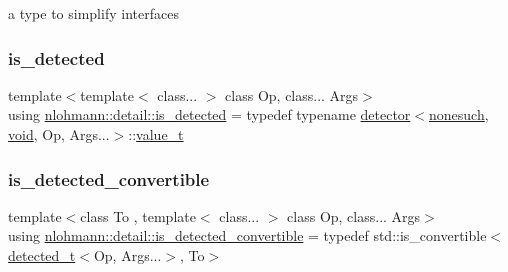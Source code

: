 a type to simplify interfaces 

\mbox{\label{namespacenlohmann_1_1detail_a9135fcf616d6ac6e231a86e0a055ac44}} 
\subsubsection{\texorpdfstring{is\_detected}{is\_detected}}
{\footnotesize\ttfamily template$<$template$<$ class... $>$ class Op, class... Args$>$ \\
using \mbox{\hyperlink{namespacenlohmann_1_1detail_a9135fcf616d6ac6e231a86e0a055ac44}{nlohmann\+::detail\+::is\+\_\+detected}} = typedef typename \mbox{\hyperlink{structnlohmann_1_1detail_1_1detector}{detector}}$<$\mbox{\hyperlink{structnlohmann_1_1detail_1_1nonesuch}{nonesuch}}, \mbox{\hyperlink{namespacenlohmann_1_1detail_a59fca69799f6b9e366710cb9043aa77d}{void}}, Op, Args...$>$\+::\mbox{\hyperlink{namespacenlohmann_1_1detail_a1ed8fc6239da25abcaf681d30ace4985}{value\+\_\+t}}}

\mbox{\label{namespacenlohmann_1_1detail_a5262e531c46e357b33007060f294673b}} 
\subsubsection{\texorpdfstring{is\_detected\_convertible}{is\_detected\_convertible}}
{\footnotesize\ttfamily template$<$class To , template$<$ class... $>$ class Op, class... Args$>$ \\
using \mbox{\hyperlink{namespacenlohmann_1_1detail_a5262e531c46e357b33007060f294673b}{nlohmann\+::detail\+::is\+\_\+detected\+\_\+convertible}} = typedef std\+::is\+\_\+convertible$<$\mbox{\hyperlink{namespacenlohmann_1_1detail_a37e97a32d0b94ce5f745427e4e40204d}{detected\+\_\+t}}$<$Op, Args...$>$, To$>$}

\mbox{\label{namespacenlohmann_1_1detail_a7542b4dbac07817fd4849ecfa4619def}} 
